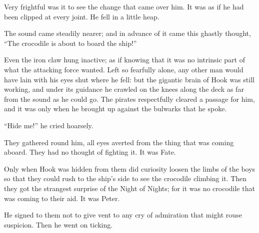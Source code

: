 Very frightful was it to see the change that came over him. It was as
if he had been clipped at every joint. He fell in a little heap.

The sound came steadily nearer; and in advance of it came this ghastly
thought, ``The crocodile is about to board the ship!''

Even the iron claw hung inactive; as if knowing that it was no
intrinsic part of what the attacking force wanted. Left so fearfully
alone, any other man would have lain with his eyes shut where he fell:
but the gigantic brain of Hook was still working, and under its
guidance he crawled on the knees along the deck as far from the sound
as he could go. The pirates respectfully cleared a passage for him, and
it was only when he brought up against the bulwarks that he spoke.

``Hide me!'' he cried hoarsely.

They gathered round him, all eyes averted from the thing that was
coming aboard. They had no thought of fighting it. It was Fate.

Only when Hook was hidden from them did curiosity loosen the limbs of
the boys so that they could rush to the ship's side to see the
crocodile climbing it. Then they got the strangest surprise of the
Night of Nights; for it was no crocodile that was coming to their aid.
It was Peter.

He signed to them not to give vent to any cry of admiration that might
rouse suspicion. Then he went on ticking.
